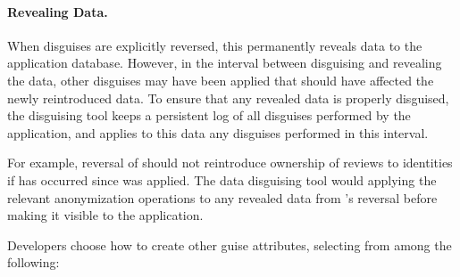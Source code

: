 \paragraph{Revealing Data.}
When disguises are explicitly reversed, this permanently reveals data to the application database.
However, in the interval between disguising and revealing the data, other disguises may have been applied that
should have affected the newly reintroduced data. To ensure that any revealed data is properly disguised,
the disguising tool keeps a persistent log of all disguises performed by the application, and
applies to this data any disguises performed in this interval.

For example, reversal of \gdpr should not reintroduce ownership of reviews to identities if \ca has
occurred since \gdpr was applied. The data disguising tool would applying the relevant \ca
anonymization operations to any revealed data from \gdpr's reversal before making it visible to the application.


\iffalse
%

%
%
%
Developers choose how to create other guise attributes, selecting from among the following:
%
